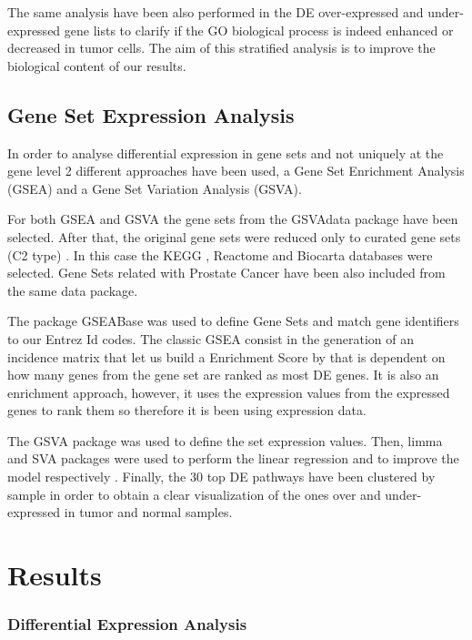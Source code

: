 \documentclass[9pt,twocolumn,twoside]{gsajnl}
\begin{document}
The same analysis have been also performed in the DE over-expressed and under-expressed gene lists to clarify if the GO biological process is indeed enhanced or decreased in tumor cells. The aim of this stratified analysis is to improve the biological content of our results.


\subsection*{Gene Set Expression Analysis}
In order to analyse differential expression in gene sets and not uniquely at the gene level 2 different approaches have been used, a Gene Set Enrichment Analysis (GSEA) and a Gene Set Variation Analysis (GSVA).


For both GSEA and GSVA the gene sets from the GSVAdata package \cite{GSVAdata} have been selected. After that, the original gene sets were reduced only to curated gene sets  (C2 type) . In this case the KEGG  \cite{kanehisa2016kegg}, Reactome \cite{fabregat2016reactome} and   Biocarta \cite{nishimura2001biocarta} databases were selected. Gene Sets related with Prostate Cancer have been also included from the same data package.


The package GSEABase \cite{GSEABase} was used to define Gene Sets and match gene identifiers to our Entrez Id codes. The classic GSEA consist in the generation of an incidence matrix that let us build a Enrichment Score by that is dependent on how many genes from the gene set are ranked as most DE genes. It is also an enrichment approach, however, it uses the expression values from the expressed genes to rank them so therefore it is been using expression data.

The GSVA package \cite{GSVA} was used to define the set expression values. Then, limma  \cite{limma} and SVA packages were used to perform the linear regression and to improve the model respectively \cite{leek2007capturing,svamanual} . Finally, the 30 top DE pathways have been clustered by sample in order to obtain a clear visualization of the ones over and under-expressed in tumor and normal samples.


\section*{Results}
\subsubsection*{Differential Expression Analysis}
\end{document}
